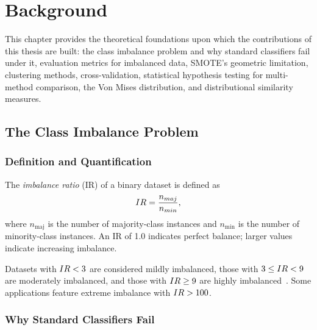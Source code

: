 
\chapter{Background}
\label{ch:background}

This chapter provides the theoretical foundations upon which the contributions of this thesis are built:
the class imbalance problem and why standard classifiers fail under it, evaluation metrics for imbalanced data, SMOTE's geometric limitation, clustering methods, cross-validation, statistical hypothesis testing for multi-method comparison, the Von Mises distribution, and distributional similarity measures.

\section{The Class Imbalance Problem}
\label{sec:bg:imbalance}

\subsection{Definition and Quantification}

\begin{definition}
\label{def:ir}
The \emph{imbalance ratio} (IR) of a binary dataset is defined as
\begin{equation}
  IR = \frac{n_{maj}}{n_{min}},
  \label{eq:ir}
\end{equation}
where $n_{\mathrm{maj}}$ is the number of majority-class instances and $n_{\mathrm{min}}$ is the number of minority-class instances.
An IR of 1.0 indicates perfect balance; larger values indicate increasing imbalance.
\end{definition}

Datasets with $IR < 3$ are considered mildly imbalanced, those with $3 \leq IR < 9$ are moderately imbalanced, and those with $IR \geq 9$ are highly imbalanced~\cite{fernandez2018learning}.
Some applications feature extreme imbalance with $IR > 100$.

\subsection{Why Standard Classifiers Fail}

